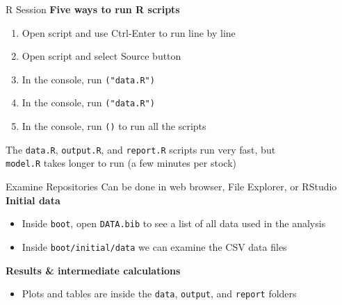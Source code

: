 \documentclass[aspectratio=169]{beamer}
\begin{document}

\begin{frame}{R Session}
  \textbf{\darkgreen Five ways to run R scripts}\\[1.5ex]
  \begin{enumerate}
    \item Open script and use {\darkblue Ctrl-Enter} to run line by line\\[2ex]
    \item Open script and select {\darkblue Source} button\\[2ex]
    \item In the console, run {\tt {}("data.R")}\\[2ex]
    \item In the console, run {\tt {}("data.R")}\\[2ex]
    \item In the console, run {\tt {}()} to run all the
    scripts\\[2ex]
  \end{enumerate}
  \vspace{1ex}
  The {\tt\darkgreen data.R}, {\tt\darkgreen output.R}, and
  {\tt\darkgreen report.R} scripts run very fast, but\\[0.2ex]
  {\tt\orange model.R} takes longer to run (a few minutes per stock)
\end{frame}


\begin{frame}{Examine Repositories}
  Can be done in {\darkgreen web browser}, {\darkgreen File Explorer}, or
  {\darkgreen RStudio}\\[4ex]
  {\bf\darkgreen Initial data}\\[1ex]
  \begin{itemize}
    \item[] Inside {\tt boot}, open {\tt\darkgreen DATA.bib} to see a list of
    all data used in the analysis\\[2ex]
    \item[] Inside {\tt boot/initial/data} we can examine the
    {\darkgreen CSV data files}\\[2ex]
  \end{itemize}
  \vspace{3ex}
  {\bf\darkgreen Results \& intermediate calculations}\\[1ex]
  \begin{itemize}
    \item[] {\darkgreen Plots} and {\darkgreen tables} are inside the
    {\tt data}, {\tt output}, and {\tt report} folders\\[2ex]
  \end{itemize}
\end{frame}
\end{document}
